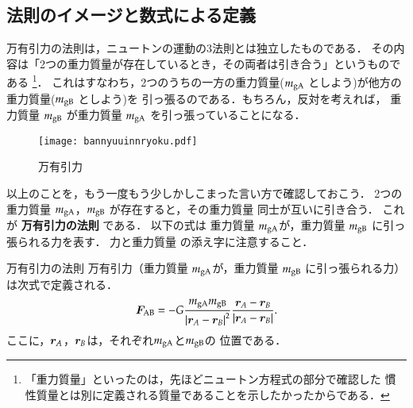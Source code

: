             \subsection{法則のイメージと数式による定義}
            万有引力の法則は，ニュートンの運動の3法則とは独立したものである．
            その内容は「2つの重力質量が存在しているとき，その両者は引き合う」というものである
                \footnote{
                    「重力質量」といったのは，先ほどニュートン方程式の部分で確認した
                    慣性質量とは別に定義される質量であることを示したかったからである．
                }．
            これはすなわち，2つのうちの一方の重力質量($m_{\rm{gA}}$ としよう)が他方の
            重力質量($m_{\rm{gB}}$ としよう)を
            引っ張るのである．もちろん，反対を考えれば，
            重力質量 $m_{\rm{gB}}$ が重力質量 $m_{\rm{gA}}$ を引っ張っていることになる．
            \begin{figure}[hbt]
                \begin{center}
                    \texttt{[image: bannyuuinnryoku.pdf]}
                    \caption{万有引力}
                    \label{fig:bannyuuinnryoku}
                \end{center}
            \end{figure}

            以上のことを，もう一度もう少しかしこまった言い方で確認しておこう．
            2つの重力質量 $m_{\rm{gA}}$，$m_{\rm{gB}}$ が存在すると，その重力質量
            同士が互いに引き合う．
            これが \textbf{万有引力の法則} である．
            以下の式は 重力質量 $m_{\rm{gA}}$が，重力質量 $m_{\rm{gB}}$ に引っ張られる力を表す．
            力と重力質量 の添え字に注意すること．
                \begin{myshadebox}{万有引力の法則}
                    万有引力（重力質量 $m_{\rm{gA}}$が，重力質量 $m_{\rm{gB}}$ に引っ張られる力）
                    は次式で定義される．
                    \begin{align}\label{Grav}
                        \bF_{\rm{AB}}
                        = -G\frac{m_{\rm{gA}}m_{\rm{gB}}}{{\left| \br_{A}
                        -\br_{B} \right|}^{2}}
                        \frac{\br_{A}-\br_{B}}{\left| \br_{A}
                        -\br_{B} \right|}.
                    \end{align}
                    ここに，$\boldsymbol{r}_{A}$，$\boldsymbol{r}_{B}$は，それぞれ$m_{\rm{gA}}$と$m_{\rm{gB}}$の 位置である．
                \end{myshadebox}

